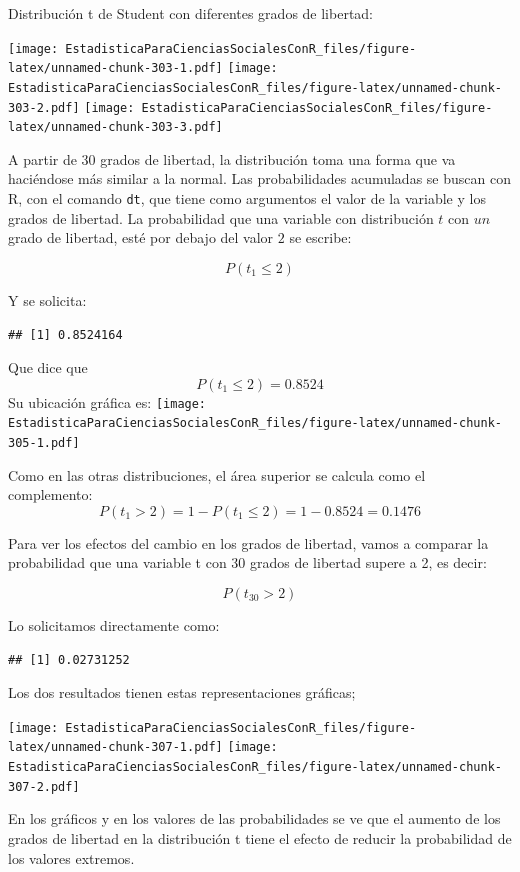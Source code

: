 \documentclass[]{book}
\begin{document}
Distribución t de Student con diferentes grados de libertad:

\texttt{[image: EstadisticaParaCienciasSocialesConR\_files/figure-latex/unnamed-chunk-303-1.pdf]} \texttt{[image: EstadisticaParaCienciasSocialesConR\_files/figure-latex/unnamed-chunk-303-2.pdf]} \texttt{[image: EstadisticaParaCienciasSocialesConR\_files/figure-latex/unnamed-chunk-303-3.pdf]}

A partir de 30 grados de libertad, la distribución toma una forma que va haciéndose más similar a la normal. Las probabilidades acumuladas se
buscan con R, con el comando \texttt{dt}, que tiene como argumentos el
valor de la variable y los grados de libertad. La probabilidad que una variable con distribución \(t\) con \(un\) grado de libertad, esté por debajo del valor \(2\) se escribe:

\[P(t_{1} \leq 2)\]

Y se solicita:

\begin{verbatim}
## [1] 0.8524164
\end{verbatim}

Que dice que \[P(t_{1} \leq 2)=0.8524\]
Su ubicación gráfica es:
\texttt{[image: EstadisticaParaCienciasSocialesConR\_files/figure-latex/unnamed-chunk-305-1.pdf]}

Como en las otras distribuciones, el área superior se calcula como el complemento: \[P(t_{1} > 2)=1-P(t_{1}\leq2)=1-0.8524=0.1476\]

Para ver los efectos del cambio en los grados de libertad, vamos a
comparar la probabilidad que una variable t con 30 grados de libertad
supere a 2, es decir:

\[P(t_{30} > 2)\]

Lo solicitamos directamente como:

\begin{verbatim}
## [1] 0.02731252
\end{verbatim}

Los dos resultados tienen estas representaciones gráficas;

\texttt{[image: EstadisticaParaCienciasSocialesConR\_files/figure-latex/unnamed-chunk-307-1.pdf]} \texttt{[image: EstadisticaParaCienciasSocialesConR\_files/figure-latex/unnamed-chunk-307-2.pdf]}

En los gráficos y en los valores de las probabilidades se ve que el
aumento de los grados de libertad en la distribución t tiene el efecto
de reducir la probabilidad de los valores extremos.
\end{document}
